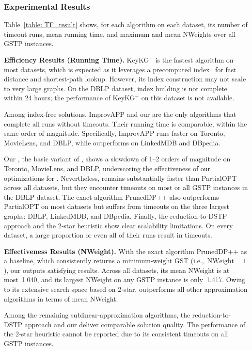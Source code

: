 \subsubsection{Experimental Results}
\label{subsubsec: main-exper-results}

Table~\ref{table: TF_result} shows, for each algorithm on each dataset, its number of timeout runs, mean running time, and maximum and mean NWeights over all GSTP instances.

\textbf{Efficiency Results (Running Time).}
KeyKG$^+$ is the fastest algorithm on most datasets, which is expected as it leverages a precomputed index~\cite{PLL} for fast distance and shortest-path lookup. However, its index construction may not scale to very large graphs. On the DBLP dataset, index building is not complete within 24 hours; the performance of KeyKG$^+$ on this dataset is not available.

Among index-free solutions, ImprovAPP and our \ImprovPTS are the only algorithms that complete all runs without timeouts. Their running time is comparable, within the same order of magnitude. Specifically, ImprovAPP runs faster on Toronto, MovieLens, and DBLP, while \ImprovPTS outperforms on LinkedMDB and DBpedia.

Our \Basic, the basic variant of \ImprovPTS, shows a slowdown of 1--2 orders of magnitude on Toronto, MovieLens, and DBLP, underscoring the effectiveness of our optimizations for \ImprovPTS. Nevertheless, \Basic remains substantially faster than PartialOPT across all datasets, but they encounter timeouts on most or all GSTP instances in the DBLP dataset.
The exact algorithm PrunedDP++ also outperforms PartialOPT on most datasets but suffers from timeouts on the three largest graphs: DBLP, LinkedMDB, and DBpedia.
Finally, the reduction-to-DSTP approach and the 2‑star heuristic show clear scalability limitations. On every dataset, a large proportion or even all of their runs result in timeouts.

\textbf{Effectiveness Results (NWeight).}
With the exact algorithm PrunedDP++ as a baseline, which consistently returns a minimum-weight GST (i.e.,~$\text{NWeight}=1$), our \ImprovPTS outputs satisfying results. Across all datasets, its mean NWeight is at most~1.040, and its largest NWeight on any GSTP instance is only~1.417. Owing to its extensive search space based on 2-star, \ImprovPTS outperforms all other approximation algorithms in terms of mean NWeight.

Among the remaining sublinear-approximation algorithms, the reduction-to-DSTP approach and our \Basic deliver comparable solution quality. The performance of the 2-star heuristic cannot be reported due to its consistent timeouts on all GSTP instances.

